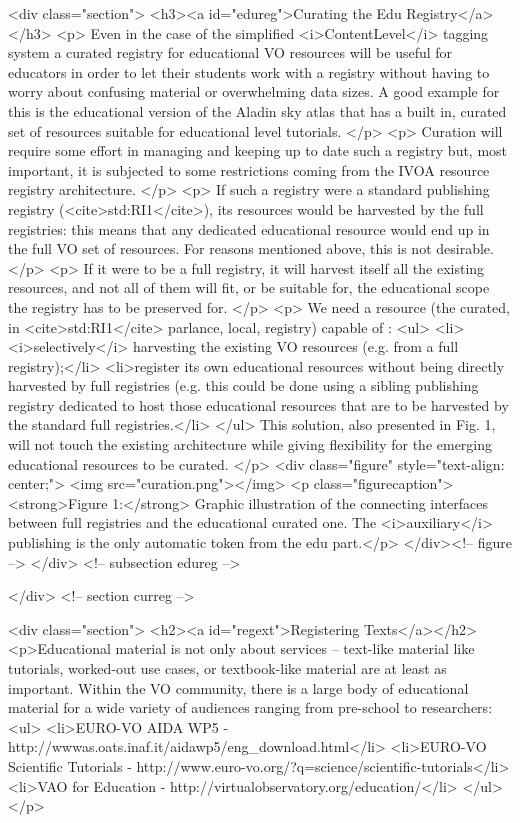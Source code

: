 <div class="section">
  <h3><a id="edureg">Curating the Edu Registry</a></h3>
  <p>
  Even in the case of the simplified <i>ContentLevel</i> tagging system
  a curated registry for educational VO resources will be useful for
  educators in order to let their students work with a registry without having to
  worry about confusing material or overwhelming data sizes. A good example
  for this is the educational version of the Aladin sky atlas that has a
  built in, curated set of resources suitable for educational level 
  tutorials.
  </p>
  <p>
  Curation will require some effort in managing and keeping up to date
  such a registry but, most important, it is subjected to  some restrictions coming from
  the IVOA resource registry architecture. 
  </p>
  <p>
  If such a registry were a standard publishing registry
  (<cite>std:RI1</cite>),
  its resources would be harvested by the full registries: this means 
  that any dedicated educational resource would end up in the full VO 
  set of resources.  For reasons mentioned above, this is not
  desirable.</p>
  <p>
  If it were to be a full registry, it will harvest itself all the existing
  resources, and not all of them will fit, or be suitable for, the educational
  scope the registry has to be preserved for.
  </p>
  <p>
  We need a resource (the curated, in <cite>std:RI1</cite>
  parlance, local, registry) capable of :
  <ul>
	<li><i>selectively</i> harvesting the existing VO resources 
	(e.g. from a full registry);</li>
	<li>register its own educational resources without being directly
	harvested by full registries (e.g. this could be done using a
	sibling publishing registry dedicated to host those educational
	resources that are to be harvested by the standard full registries.</li>
  </ul>
  This solution, also presented in Fig. 1, will not touch the existing architecture
  while giving flexibility for the emerging educational resources to 
  be curated.
  </p>
  <div class="figure" style="text-align: center;">
    <img src="curation.png"></img>
    <p class="figurecaption"><strong>Figure 1:</strong> Graphic illustration
    of the connecting interfaces between full registries and the educational
    curated one. The <i>auxiliary</i> publishing is the only automatic token
    from the edu part.</p>  
  </div><!-- figure -->
</div> <!-- subsection edureg -->

</div> <!-- section curreg -->

<div class="section">
<h2><a id="regext">Registering Texts</a></h2>
<p>Educational material is not only about services – text-like material
like tutorials, worked-out use cases, or textbook-like material are at
least as important.  Within the VO community, there is a large body of
educational material for a wide variety of audiences ranging from pre-school to
researchers:
<ul>
<li>EURO-VO AIDA WP5 - http://wwwas.oats.inaf.it/aidawp5/eng_download.html</li>
<li>EURO-VO Scientific Tutorials - http://www.euro-vo.org/?q=science/scientific-tutorials</li>
<li>VAO for Education - http://virtualobservatory.org/education/</li>
</ul>
</p>

